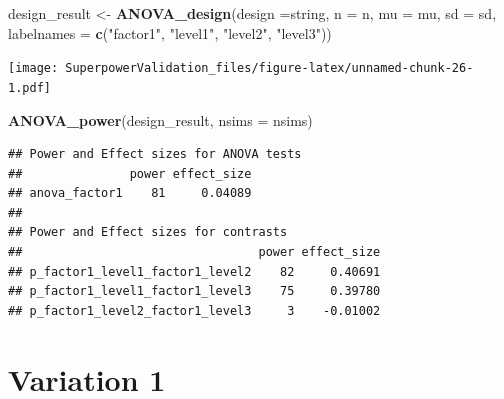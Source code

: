 \documentclass[]{book}
\newenvironment{Shaded}{\begin{snugshade}}{\end{snugshade}}
\newcommand{\DataTypeTok}[1]{\textcolor[rgb]{0.13,0.29,0.53}{#1}}
\newcommand{\KeywordTok}[1]{\textcolor[rgb]{0.13,0.29,0.53}{\textbf{#1}}}
\newcommand{\NormalTok}[1]{#1}
\newcommand{\StringTok}[1]{\textcolor[rgb]{0.31,0.60,0.02}{#1}}
\begin{document}
\begin{Shaded}
\begin{Highlighting}[]
\NormalTok{design_result <-}\StringTok{ }\KeywordTok{ANOVA_design}\NormalTok{(}\DataTypeTok{design =}\NormalTok{string,}
                   \DataTypeTok{n =}\NormalTok{ n, }
                   \DataTypeTok{mu =}\NormalTok{ mu, }
                   \DataTypeTok{sd =}\NormalTok{ sd, }
                   \DataTypeTok{labelnames =} \KeywordTok{c}\NormalTok{(}\StringTok{"factor1"}\NormalTok{, }\StringTok{"level1"}\NormalTok{, }\StringTok{"level2"}\NormalTok{, }\StringTok{"level3"}\NormalTok{))}
\end{Highlighting}
\end{Shaded}

\texttt{[image: SuperpowerValidation\_files/figure-latex/unnamed-chunk-26-1.pdf]}

\begin{Shaded}
\begin{Highlighting}[]
\KeywordTok{ANOVA_power}\NormalTok{(design_result, }\DataTypeTok{nsims =}\NormalTok{ nsims)}
\end{Highlighting}
\end{Shaded}

\begin{verbatim}
## Power and Effect sizes for ANOVA tests
##               power effect_size
## anova_factor1    81     0.04089
## 
## Power and Effect sizes for contrasts
##                                 power effect_size
## p_factor1_level1_factor1_level2    82     0.40691
## p_factor1_level1_factor1_level3    75     0.39780
## p_factor1_level2_factor1_level3     3    -0.01002
\end{verbatim}

\hypertarget{variation-1}{%
\section{Variation 1}\label{variation-1}}
\end{document}
